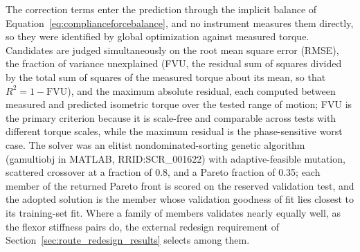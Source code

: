 \documentclass[utf8]{FrontiersinHarvard} %
\begin{document}
The correction terms enter the prediction through the implicit balance of Equation~\eqref{eq:complianceforcebalance}, and no instrument measures them directly, so they were identified by global optimization against measured torque. Candidates are judged simultaneously on the root mean square error (RMSE), the fraction of variance unexplained (FVU, the residual sum of squares divided by the total sum of squares of the measured torque about its mean, so that $R^{2} = 1 - \mathrm{FVU}$), and the maximum absolute residual, each computed between measured and predicted isometric torque over the tested range of motion; FVU is the primary criterion because it is scale-free and comparable across tests with different torque scales, while the maximum residual is the phase-sensitive worst case. The solver was an elitist nondominated-sorting genetic algorithm (gamultiobj in MATLAB, RRID:SCR\_001622) with adaptive-feasible mutation, scattered crossover at a fraction of 0.8, and a Pareto fraction of 0.35; each member of the returned Pareto front is scored on the reserved validation test, and the adopted solution is the member whose validation goodness of fit lies closest to its training-set fit. Where a family of members validates nearly equally well, as the flexor stiffness pairs do, the external redesign requirement of Section~\ref{sec:route_redesign_results} selects among them.
\end{document}
